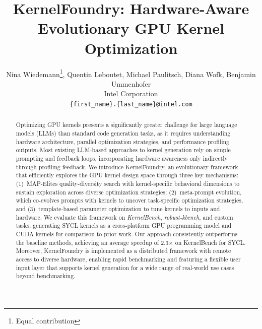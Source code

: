 \documentclass{article}
\title{KernelFoundry: Hardware-Aware Evolutionary GPU Kernel Optimization
}
\author{
  Nina Wiedemann\thanks{Equal contribution},\hspace{1pt} Quentin Leboutet\footnotemark[1], \hspace{1pt}Michael Paulitsch, Diana Wofk, Benjamin Ummenhofer\\
  Intel Corporation \\
  \texttt{\{first\_name\}.\{last\_name\}@intel.com} \\
}
\begin{document}
\maketitle


\begin{abstract}

Optimizing GPU kernels presents a significantly greater challenge for large language models (LLMs) than standard code generation tasks, as it requires understanding hardware architecture, parallel optimization strategies, and performance profiling outputs. Most existing LLM-based approaches to kernel generation rely on simple prompting and feedback loops, incorporating hardware awareness only indirectly through profiling feedback. We introduce KernelFoundry, an evolutionary framework that efficiently explores the GPU kernel design space through three key mechanisms:
(1)~MAP-Elites quality-diversity search with kernel-specific behavioral dimensions to sustain exploration across diverse optimization strategies; (2)~meta-prompt evolution, which co-evolves prompts with kernels %
to uncover task-specific optimization strategies, and (3)~template-based parameter optimization to tune kernels to inputs and hardware. We evaluate this framework on \textit{KernelBench}, \textit{robust-kbench}, and custom tasks, generating SYCL kernels as a cross-platform GPU programming model and CUDA kernels for comparison to prior work. Our approach consistently outperforms the baseline methods, achieving an average speedup of 2.3× on KernelBench for SYCL. Moreover, KernelFoundry is implemented as a distributed framework with remote access to diverse hardware, enabling rapid benchmarking and featuring a flexible user input layer that supports kernel generation for a wide range of real-world use cases beyond benchmarking.

\end{abstract}



 








  
  


\end{document}
